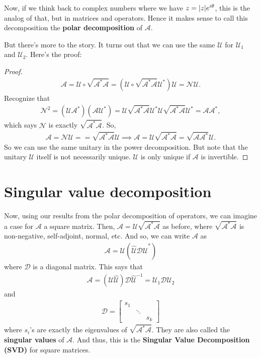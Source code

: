 \documentclass{article}
\theoremstyle{definition}
\newcommand{\Uni}{\mathcal{U}}
\newcommand{\A}{\mathcal{A}}
\newcommand{\N}{\mathcal{N}}
\newcommand{\lp}{\left(}
\newcommand{\rp}{\right)}
\begin{document}
Now, if we think back to complex numbers where we have $z = \abs{z}e^{i\theta}$, this is the analog of that, but in matrices and operators. Hence it makes sense to call this decomposition the \textbf{polar decomposition} of $\A$. 

But there's more to the story. It turns out that we can use the same $\Uni$ for $\Uni_1$ and $\Uni_2$. Here's the proof:
\begin{proof}
	\begin{align*}
	\A = \Uni \circ \sqrt{\A^*\A} = \lp \Uni \circ \sqrt{\A^*\A} \Uni^* \rp \Uni = \N \Uni.
	\end{align*}
	Recognize that
	\begin{align*}
	\N^2 = (\Uni \A^*)(\A \Uni^*) = \Uni \sqrt{\A^*\A} \Uni^*\Uni \sqrt{\A^*\A} \Uni^* =  \A \A^*,
	\end{align*}
	which says $\N$ is exactly $\sqrt{\A^*\A}$. So, 
	\begin{align*}
	\A = \N \Uni = = \sqrt{\A^*\A}\Uni \implies \A=  \Uni \sqrt{\A^*\A} = \sqrt{\A\A^*}\Uni.
	\end{align*}
	So we can use the same unitary in the power decomposition. But note that the unitary $\Uni$ itself is not necessarily unique. $\Uni$ is only unique if $\A$ is invertible. 
\end{proof}









\newpage 

\section{Singular value decomposition}




Now, using our results from the polar decomposition of operators, we can imagine a case for $\A$ a square matrix. Then, $\A = \Uni \sqrt{\A^*\A}$ as before, where $\sqrt{\A^*\A}$ is non-negative, self-adjoint, normal, etc. And so, we can write $\A$ as
\begin{align*}
\A = \Uni \lp \hat{\Uni} \mathcal{D} \hat{\Uni}^* \rp
\end{align*}
where $\mathcal{D}$ is a diagonal matrix. This says that 
\begin{align*}
\A = (\Uni \hat{\Uni}) \mathcal{D} \hat{\Uni}^{-1} = \Uni_1 \mathcal{D} \Uni_2
\end{align*}
and 
\begin{align*}
\mathcal{D} = \begin{bmatrix}
s_1 & & \\
& \ddots & \\
& & s_k
\end{bmatrix}
\end{align*}
where $s_i$'s are exactly the eigenvalues of $\sqrt{\A^*\A}$. They are also called the \textbf{singular values} of $\A$. And thus, this is the \textbf{Singular Value Decomposition (SVD)} for square matrices. 
\end{document}
